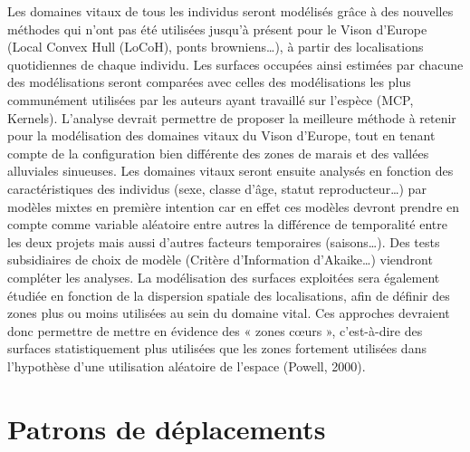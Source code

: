 \documentclass[
  letterpaper,
  DIV=11,
  numbers=noendperiod]{scrreprt}
\begin{document}
Les domaines vitaux de tous les individus seront modélisés grâce à des
nouvelles méthodes qui n'ont pas été utilisées jusqu'à présent pour le
Vison d'Europe (Local Convex Hull (LoCoH), ponts browniens\ldots), à
partir des localisations quotidiennes de chaque individu. Les surfaces
occupées ainsi estimées par chacune des modélisations seront comparées
avec celles des modélisations les plus communément utilisées par les
auteurs ayant travaillé sur l'espèce (MCP, Kernels). L'analyse devrait
permettre de proposer la meilleure méthode à retenir pour la
modélisation des domaines vitaux du Vison d'Europe, tout en tenant
compte de la configuration bien différente des zones de marais et des
vallées alluviales sinueuses. Les domaines vitaux seront ensuite
analysés en fonction des caractéristiques des individus (sexe, classe
d'âge, statut reproducteur\ldots) par modèles mixtes en première
intention car en effet ces modèles devront prendre en compte comme
variable aléatoire entre autres la différence de temporalité entre les
deux projets mais aussi d'autres facteurs temporaires (saisons\ldots).
Des tests subsidiaires de choix de modèle (Critère d'Information
d'Akaike\ldots) viendront compléter les analyses. La modélisation des
surfaces exploitées sera également étudiée en fonction de la dispersion
spatiale des localisations, afin de définir des zones plus ou moins
utilisées au sein du domaine vital. Ces approches devraient donc
permettre de mettre en évidence des « zones cœurs », c'est-à-dire des
surfaces statistiquement plus utilisées que les zones fortement
utilisées dans l'hypothèse d'une utilisation aléatoire de l'espace
(Powell, 2000).

\section{Patrons de déplacements}\label{patrons-de-duxe9placements}
\end{document}
